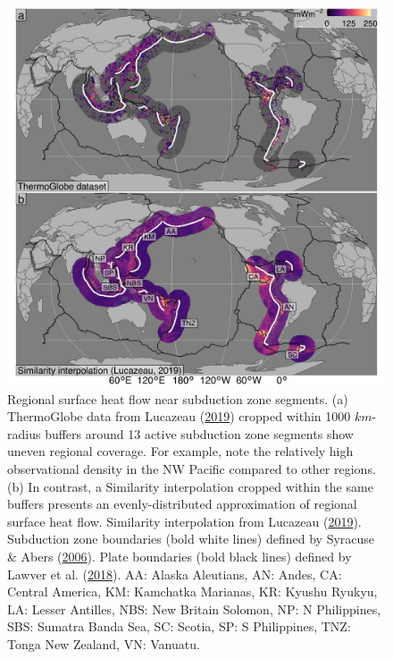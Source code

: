 \begin{figure}[htbp]

{\centering \includegraphics[width=1\linewidth,]{assets/figs/chpt3/ThermoGlobeBufferComp} 

}

\caption[Similarity interpolation of near 13 active subduction zone segments]{Regional surface heat flow near subduction zone segments. (a) ThermoGlobe data from Lucazeau (\protect\hyperlink{ref-lucazeau2019}{2019}) cropped within 1000 \(km\)-radius buffers around 13 active subduction zone segments show uneven regional coverage. For example, note the relatively high observational density in the NW Pacific compared to other regions. (b) In contrast, a Similarity interpolation cropped within the same buffers presents an evenly-distributed approximation of regional surface heat flow. Similarity interpolation from Lucazeau (\protect\hyperlink{ref-lucazeau2019}{2019}). Subduction zone boundaries (bold white lines) defined by Syracuse \& Abers (\protect\hyperlink{ref-syracuse2006}{2006}). Plate boundaries (bold black lines) defined by Lawver et al. (\protect\hyperlink{ref-lawver2018}{2018}). AA: Alaska Aleutians, AN: Andes, CA: Central America, KM: Kamchatka Marianas, KR: Kyushu Ryukyu, LA: Lesser Antilles, NBS: New Britain Solomon, NP: N Philippines, SBS: Sumatra Banda Sea, SC: Scotia, SP: S Philippines, TNZ: Tonga New Zealand, VN: Vanuatu.}\label{fig:globalhfComp}
\end{figure}

